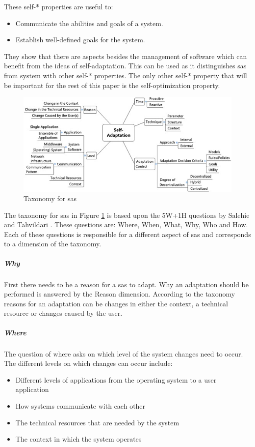 \noindent These self-* properties are useful to:
\begin{itemize}[nosep]
    \item Communicate the abilities and goals of a system.
    \item Establish well-defined goals for the system.
\end{itemize}
They show that there are aspects besides the management of software which can benefit from the ideas of self-adaptation.
This can be used as it distinguishes \acrshort{sas} from system with other self-* properties.
The only other self-* property that will be important for the rest of this paper is the self-optimization property.

\begin{figure}[t!]
    \includegraphics[width=\textwidth]{images/KrupitzerTaxonomy.jpg}
    \caption{Taxonomy for \acrshort{sas} \cite*{SurveyOnEngineeringApproaches}}
    \label{fig:KrupitzerTaxonomy}
\end{figure}

\noindent The taxonomy for \acrshort{sas} in Figure \ref{fig:KrupitzerTaxonomy}
is based upon the 5W+1H questions by Salehie and Tahvildari \cite*{LandscapeAndResearchChallenges}.
These questions are: Where, When, What, Why, Who and How.
Each of these questions is responsible for a different aspect of \acrshort{sas} and corresponds to a dimension of the taxonomy.

\subparagraph*{Why}
First there needs to be a reason for a \acrshort{sas} to adapt. Why an adaptation should be performed is answered by the Reason dimension.
According to the taxonomy reasons for an adaptation can be changes in either the context, a technical resource or changes caused by the user.

\subparagraph*{Where}
The question of where asks on which level of the system changes need to occur.
The different levels on which changes can occur include:
\begin{itemize}[nosep]
    \item Different levels of applications from the operating system to a user application
    \item How systems communicate with each other
    \item The technical resources that are needed by the system
    \item The context in which the system operates
\end{itemize}

